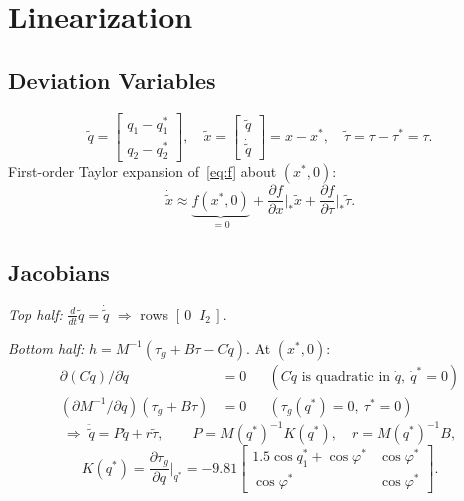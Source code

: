 \documentclass[10pt,twocolumn,letterpaper]{article}
\begin{document}
\newpage
\section{Linearization}
\subsection{Deviation Variables}
\begin{equation*}
\tilde q=\begin{bmatrix}q_1-q_1^*\\ q_2-q_2^*\end{bmatrix},\quad
\tilde x=\begin{bmatrix}\tilde q\\ \dot{\tilde q}\end{bmatrix}=x-x^*,\quad
\tilde\tau=\tau-\tau^*=\tau .
\end{equation*}
First-order Taylor expansion of~\eqref{eq:f} about $(x^*,0)$:
\begin{equation*}
\dot{\tilde x}\approx\underbrace{f(x^*,0)}_{=0}+\frac{\partial f}{\partial x}\Big|_*\tilde x+\frac{\partial f}{\partial\tau}\Big|_*\tilde\tau .
\end{equation*}

\subsection{Jacobians}
\textit{Top half:} $\tfrac{d}{dt}\tilde q=\dot{\tilde q}$ $\Rightarrow$ rows $[\,0\;\;I_2\,]$.

\textit{Bottom half:} $h=M^{-1}(\tau_g+B\tau-C\dot q)$. At $(x^*,0)$:
\begin{align*}
\partial(C\dot q)/\partial\dot q&=0 &&(C\dot q\text{ is quadratic in }\dot q,\ \dot q^*=0)\\
(\partial M^{-1}/\partial q)(\tau_g+B\tau)&=0 &&(\tau_g(q^*)=0,\ \tau^*=0)
\end{align*}
\begin{equation*}
\Rightarrow\;\ddot{\tilde q}=P\tilde q+r\tilde\tau,\qquad P=M(q^*)^{-1}K(q^*),\quad r=M(q^*)^{-1}B,
\end{equation*}
\begin{equation}
K(q^*)=\frac{\partial\tau_g}{\partial q}\Big|_{q^*}=-9.81\begin{bmatrix}1.5\cos q_1^*+\cos\varphi^* & \cos\varphi^*\\ \cos\varphi^* & \cos\varphi^*\end{bmatrix}.\label{eq:K}
\end{equation}
\end{document}
